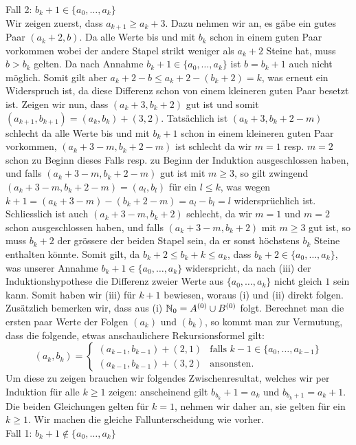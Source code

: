 Fall 2: $b_k+1\in\{a_0,…,a_k\}$\\
Wir zeigen zuerst, dass $a_{k+1}\geq a_k+3$. Dazu nehmen wir an, es gäbe ein gutes Paar $(a_k+2,b)$. Da alle Werte bis und mit $b_k$ schon in einem guten Paar vorkommen wobei der andere Stapel strikt weniger als $a_k+2$ Steine hat, muss $b>b_k$ gelten. Da nach Annahme $b_k+1\in\{a_0,…,a_k\}$ ist $b=b_k+1$ auch nicht möglich. Somit gilt aber $a_k+2-b\leq a_k+2-(b_k+2)=k$, was erneut ein Widerspruch ist, da diese Differenz schon von einem kleineren guten Paar besetzt ist. Zeigen wir nun, dass $(a_k+3,b_k+2)$ gut ist und somit $(a_{k+1},b_{k+1})=(a_k,b_k)+(3,2)$. Tatsächlich ist $(a_k+3,b_k+2-m)$ schlecht da alle Werte bis und mit $b_k+1$ schon in einem kleineren guten Paar vorkommen, $(a_k+3-m,b_k+2-m)$ ist schlecht da wir $m=1$ resp. $m=2$ schon zu Beginn dieses Falls resp. zu Beginn der Induktion ausgeschlossen haben, und falls $(a_k+3-m,b_k+2-m)$ gut ist mit $m\geq 3$, so gilt zwingend $(a_k+3-m,b_k+2-m)=(a_l,b_l)$ für ein $l\leq k$, was wegen $k+1=(a_k+3-m)-(b_k+2-m)=a_l-b_l=l$ widersprüchlich ist. Schliesslich ist auch $(a_k+3-m,b_k+2)$ schlecht, da wir $m=1$ und $m=2$ schon ausgeschlossen haben, und falls $(a_k+3-m,b_k+2)$ mit $m\geq 3$ gut ist, so muss $b_k+2$ der grössere der beiden Stapel sein, da er sonst höchstens $b_k$ Steine enthalten könnte. Somit gilt, da $b_k+2\leq b_k+k\leq a_k$, dass $b_k+2\in\{a_0,…,a_k\}$, was unserer Annahme $b_k+1\in\{a_0,…,a_k\}$ widerspricht, da nach (iii) der Induktionshypothese die Differenz zweier Werte aus $\{a_0,…,a_k\}$ nicht gleich $1$ sein kann.
Somit haben wir (iii) für $k+1$ bewiesen, woraus (i) und (ii) direkt folgen. Zusätzlich bemerken wir, dass aus (i) $\mathbb{N}_0=A^{(0)}\cup B^{(0)}$ folgt.
Berechnet man die ersten paar Werte der Folgen $(a_k)$ und $(b_k)$, so kommt man zur Vermutung, dass die folgende, etwas anschaulichere Rekursionsformel gilt:
$$
(a_k,b_k)=
\begin{cases}
(a_{k-1},b_{k-1})+(2,1) & \text{falls } k-1\in\{a_0,…,a_{k-1}\}\\
(a_{k-1},b_{k-1})+(3,2) & \text{ansonsten.}
\end{cases}
$$
Um diese zu zeigen brauchen wir folgendes Zwischenresultat, welches wir per Induktion für alle $k\geq 1$ zeigen: anscheinend gilt $b_{b_k}+1=a_k$ und $b_{b_k+1}=a_k+1$. Die beiden Gleichungen gelten für $k=1$, nehmen wir daher an, sie gelten für ein $k\geq 1$. Wir machen die gleiche Fallunterscheidung wie vorher.\\
Fall 1: $b_k+1\notin\{a_0,…,a_k\}$\\
